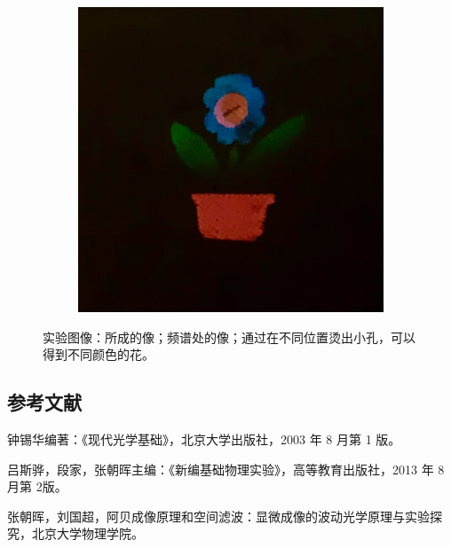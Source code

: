 \documentclass[a4paper]{article}
\begin{document}
\begin{figure}[H]
\begin{subfigure}[t]{0.3\textwidth}
        \caption{}
        \label{fig9-2}
    \end{subfigure}
    \begin{subfigure}[t]{0.3\textwidth}
        \centering
        \includegraphics[width=\textwidth]{phone-img/12.jpg}
        \caption{}
        \label{fig9-3}
    \end{subfigure}
    \captionsetup{justification=centering,subrefformat=parens,margin=2cm}
    \caption{实验图像：所成的像；频谱处的像；通过在不同位置烫出小孔，可以得到不同颜色的花。}
\end{figure}



\subsection{参考文献}
\begin{enumerate}[label={[\arabic*]}]
    \item 钟锡华编著：《现代光学基础》，北京大学出版社，2003 年 8 月第 1 版。
    \item 吕斯骅，段家，张朝晖主编：《新编基础物理实验》，高等教育出版社，2013 年 8 月第 2版。
    \item 张朝晖，刘国超，阿贝成像原理和空间滤波：显微成像的波动光学原理与实验探究，北京大学物理学院。
\end{enumerate}
\end{document}
